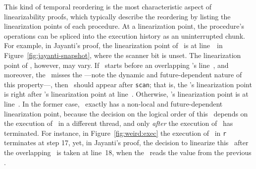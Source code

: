 This kind of temporal reordering is the most characteristic aspect of
linearizability proofs, which typically describe the reordering by
listing the linearization points of each procedure. At a linearization
point, the procedure's operations can be spliced into the execution
history as an uninterrupted chunk. For example, in Jayanti's proof,
the linearization point of \jyscan~is at line~\lineScanUnsetsS\ in
Figure~\ref{fig:jayanti-snapshot}, where the scanner bit is unset. The
linearization point of \jywrite, however, may vary. If
\jywrite~starts before an overlapping \jyscan's line~\lineScanUnsetsS,
and moreover, the \jyscan~misses the \jywrite---note the dynamic and
future-dependent nature of this property---, then \jywrite~should
appear after {\tt scan}; that is, the \jywrite's linearization point
is right after \jyscan's linearization point at line~\lineScanUnsetsS.
%
Otherwise, \jywrite's linearization point is at line~\lineWrtWrt.
%
In the former case, \jywrite~exactly has a non-local and
future-dependent linearization point, because the decision on the
logical order of this \jywrite~depends on the execution of \jyscan~in
a different thread, and only \emph{after} the execution
of \jywrite~has terminated.
%
For instance, in Figure~\ref{fig:weird:exec} the execution
of \jywrite~in \texttt{r} terminates at step 17, yet, in Jayanti's
proof, the decision to linearize this \jywrite\ after the
overlapping \jyscan\ is taken at line~18, when the \jyscan\ reads the
value from the previous \jywrite.





